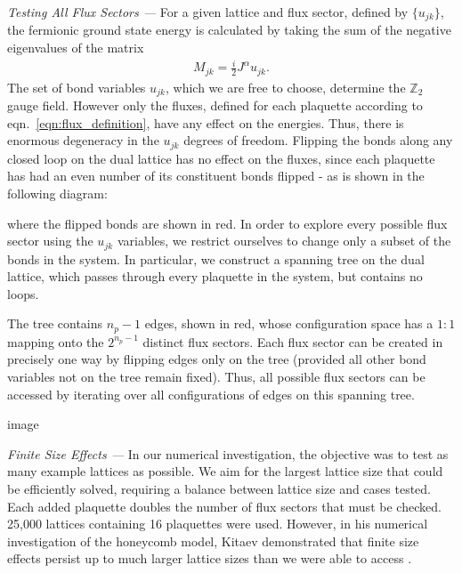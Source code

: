 \emph{Testing All Flux Sectors ---} For a given lattice and flux sector,
defined by \(\{ u_{jk}\}\), the fermionic ground state energy is
calculated by taking the sum of the negative eigenvalues of the matrix
\[\begin{aligned}
    M_{jk} = \frac{i}{2} J^{\alpha} u_{jk}.\end{aligned}\] The set of
bond variables \(u_{jk}\), which we are free to choose, determine the
\(\mathbb Z_2\) gauge field. However only the fluxes, defined for each
plaquette according to
eqn.~\protect\hyperlink{eqn:flux_definition}{{[}eqn:flux\_definition{]}},
have any effect on the energies. Thus, there is enormous degeneracy in
the \(u_{jk}\) degrees of freedom. Flipping the bonds along any closed
loop on the dual lattice has no effect on the fluxes, since each
plaquette has had an even number of its constituent bonds flipped - as
is shown in the following diagram:

where the flipped bonds are shown in red. In order to explore every
possible flux sector using the \(u_{jk}\) variables, we restrict
ourselves to change only a subset of the bonds in the system. In
particular, we construct a spanning tree on the dual lattice, which
passes through every plaquette in the system, but contains no loops.

The tree contains \(n_p - 1\) edges, shown in red, whose configuration
space has a \(1:1\) mapping onto the \(2^{n_p - 1}\) distinct flux
sectors. Each flux sector can be created in precisely one way by
flipping edges only on the tree (provided all other bond variables not
on the tree remain fixed). Thus, all possible flux sectors can be
accessed by iterating over all configurations of edges on this spanning
tree.

{image}

\emph{Finite Size Effects ---} In our numerical investigation, the
objective was to test as many example lattices as possible. We aim for
the largest lattice size that could be efficiently solved, requiring a
balance between lattice size and cases tested. Each added plaquette
doubles the number of flux sectors that must be checked. 25,000 lattices
containing 16 plaquettes were used. However, in his numerical
investigation of the honeycomb model, Kitaev demonstrated that finite
size effects persist up to much larger lattice sizes than we were able
to access \autocite{kitaevAnyonsExactlySolved2006}.

